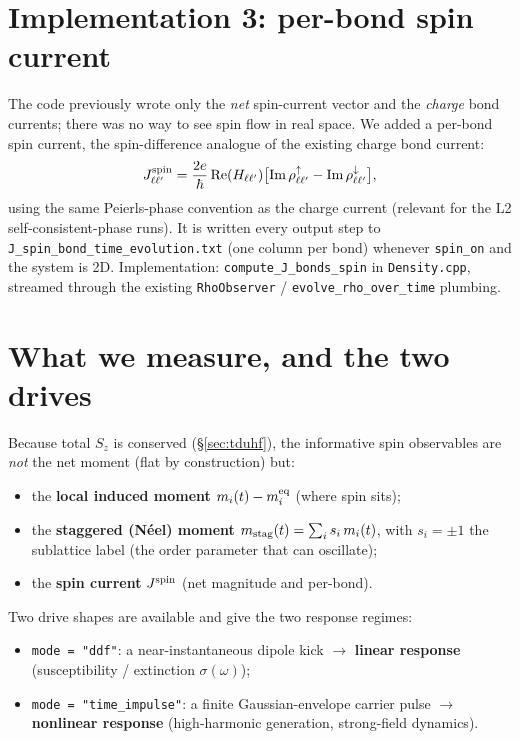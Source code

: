 \documentclass[11pt]{article}
\newcommand{\code}[1]{\texttt{\small #1}}
\begin{document}
\section{Implementation 3: per-bond spin current}
\label{sec:spincurrent}
The code previously wrote only the \emph{net} spin-current vector and the
\emph{charge} bond currents; there was no way to see spin flow in real space.
We added a per-bond spin current, the spin-difference analogue of the existing
charge bond current:
\begin{equation}
J^{\rm spin}_{\ell\ell'}=\frac{2e}{\hbar}\,\mathrm{Re}(H_{\ell\ell'})
\big[\mathrm{Im}\,\rho^{\uparrow}_{\ell\ell'}-\mathrm{Im}\,\rho^{\downarrow}_{\ell\ell'}\big],
\end{equation}
using the same Peierls-phase convention as the charge current (relevant for the
L2 self-consistent-phase runs). It is written every output step to
\code{J\_spin\_bond\_time\_evolution.txt} (one column per bond) whenever
\code{spin\_on} and the system is 2D. Implementation: \code{compute\_J\_bonds\_spin}
in \code{Density.cpp}, streamed through the existing \code{RhoObserver} /
\code{evolve\_rho\_over\_time} plumbing.

\section{What we measure, and the two drives}
\label{sec:observables}
Because total $S_z$ is conserved (\S\ref{sec:tduhf}), the informative spin
observables are \emph{not} the net moment (flat by construction) but:
\begin{itemize}
\item the \textbf{local induced moment} $m_i(t)-m_i^{\rm eq}$ (where spin sits);
\item the \textbf{staggered (N\'eel) moment}
$m_{\rm stag}(t)=\sum_i s_i\,m_i(t)$, with $s_i=\pm1$ the sublattice label
(the order parameter that can oscillate);
\item the \textbf{spin current} $J^{\rm spin}$ (net magnitude and per-bond).
\end{itemize}
Two drive shapes are available and give the two response regimes:
\begin{itemize}
\item \code{mode = "ddf"}: a near-instantaneous dipole kick $\to$
\textbf{linear response} (susceptibility / extinction $\sigma(\omega)$);
\item \code{mode = "time\_impulse"}: a finite Gaussian-envelope carrier pulse
$\to$ \textbf{nonlinear response} (high-harmonic generation, strong-field
dynamics).
\end{itemize}
\end{document}

